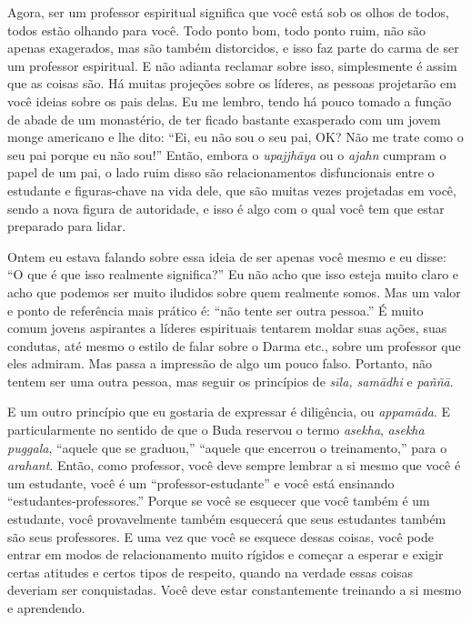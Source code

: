 Agora, ser um professor espiritual significa que você está sob os
olhos de todos, todos estão olhando para você. Todo ponto bom, todo
ponto ruim, não são apenas exagerados, mas são também distorcidos, e
isso faz parte do carma de ser um professor espiritual. E não adianta
reclamar sobre isso, simplesmente é assim que as coisas são. Há muitas
projeções sobre os líderes, as pessoas projetarão em você ideias sobre
os pais delas. Eu me lembro, tendo há pouco tomado a função de abade de
um monastério, de ter ficado bastante exasperado com um jovem monge
americano e lhe dito: “Ei, eu não sou o seu pai, \textsc{OK}? Não me trate como
o seu pai porque eu não sou!” Então, embora o \emph{upajjhāya} ou o
\emph{ajahn} cumpram o papel de um pai, o lado ruim disso são
relacionamentos disfuncionais entre o estudante e figuras-chave na vida
dele, que são muitas vezes projetadas em você, sendo a nova figura de
autoridade, e isso é algo com o qual você tem que estar preparado para
lidar. 

Ontem eu estava falando sobre essa ideia de ser apenas você mesmo e
eu disse: “O que é que isso realmente significa?” Eu não acho que isso
esteja muito claro e acho que podemos ser muito iludidos sobre quem
realmente somos. Mas um valor e ponto de referência mais prático é:
“não tente ser outra pessoa.” É muito comum jovens aspirantes a líderes
espirituais tentarem moldar suas ações, suas condutas, até mesmo o
estilo de falar sobre o Darma etc., sobre um professor que eles
admiram. Mas passa a impressão de algo um pouco falso. Portanto, não
tentem ser uma outra pessoa, mas seguir os princípios de
\emph{sīla, samādhi} e \emph{paññā}. 

E um outro princípio que eu gostaria de expressar é diligência, ou
\emph{appamāda}. E particularmente no sentido de que o Buda
reservou o termo \emph{asekha}, \emph{asekha puggala}, “aquele que
se graduou,” “aquele que encerrou o treinamento,” para o
\emph{arahant}. Então, como professor, você deve sempre lembrar a si
mesmo que você é um estudante, você é um “professor-estudante” e você
está ensinando “estudantes-professores.” Porque se você se esquecer que
você também é um estudante, você provavelmente também esquecerá que
seus estudantes também são seus professores. E uma vez que você se
esquece dessas coisas, você pode entrar em modos de relacionamento
muito rígidos e começar a esperar e exigir certas atitudes e certos
tipos de respeito, quando na verdade essas coisas deveriam ser
conquistadas. Você deve estar constantemente treinando a si mesmo e
aprendendo. 

